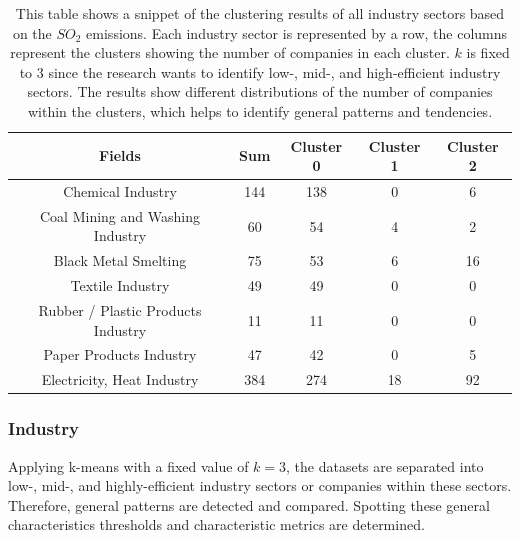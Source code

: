 \begin{table}[H]
    \centering
    \begin{tabular}{|c|c|c|c|c|}
        \hline
        \textbf{Fields} & \textbf{Sum} & \textbf{Cluster 0} & \textbf{Cluster 1} & \textbf{Cluster 2} \\
        \hline
        Chemical Industry & 144 & 138 & 0 & 6 \\
        Coal Mining and Washing Industry & 60 & 54 & 4 & 2 \\
        Black Metal Smelting & 75 & 53 & 6 & 16 \\
        Textile Industry & 49 & 49 & 0 & 0 \\
        Rubber / Plastic Products Industry & 11 & 11 & 0 & 0 \\
        Paper Products Industry & 47 & 42 & 0 & 5 \\
        Electricity, Heat Industry & 384 & 274 & 18 & 92 \\
        \hline
    \end{tabular}
    \caption{This table shows a snippet of the clustering results of all industry sectors based on the $SO_2$ emissions.
    Each industry sector is represented by a row, the columns represent the clusters showing the number of companies in each cluster.
    $k$ is fixed to $3$ since the research wants to identify low-, mid-, and high-efficient industry sectors.
    The results show different distributions of the number of companies within the clusters, which helps to identify general patterns and tendencies.
    }
    \label{tab:multi_industries_clustering_results_based_on_the_so2_emission}
\end{table}

\subsubsection{Industry}
Applying k-means with a fixed value of $k=3$, the datasets are separated into low-, mid-, and highly-efficient industry sectors or companies within these sectors.
Therefore, general patterns are detected and compared.
Spotting these general characteristics thresholds and characteristic metrics are determined.

